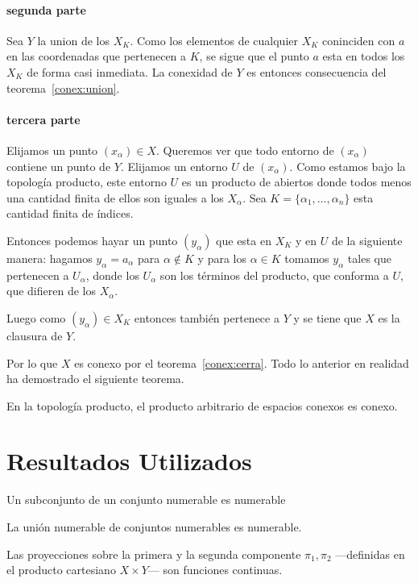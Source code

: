 \documentclass[fleqn,leqno,11pt,letterpaper,final]{article}
\begin{document}
\paragraph{segunda parte}
Sea $Y$ la union de los $X_K$. Como los elementos de cualquier $X_K$ coninciden con
$a$ en las coordenadas que pertenecen a $K$, se sigue que el punto $a$ esta en
todos los $X_K$ de forma casi inmediata. La conexidad de $Y$ es entonces consecuencia del
teorema~\ref{conex:union}.

\paragraph{tercera parte}
Elijamos un punto $(x_\alpha)\in X$. Queremos ver que todo entorno de $(x_\alpha)$ contiene
un punto de $Y$. Elijamos un entorno $U$ de $(x_\alpha)$. Como estamos bajo
la topología producto, este entorno $U$ es un producto de abiertos donde todos
menos una cantidad finita de ellos son iguales a los $X_\alpha$. Sea
$K=\{\alpha_1,\dots,\alpha_n\}$ esta cantidad finita de índices.

Entonces podemos hayar un punto $(y_\alpha)$ que esta en $X_K$ y  en $U$ de la siguiente manera:
hagamos $y_\alpha=a_\alpha$ para $\alpha\notin K$ y para los $\alpha\in K$ tomamos $y_\alpha$
tales que pertenecen a $U_\alpha$, donde los $U_\alpha$ son los términos
del producto, que conforma a $U$, que difieren de los $X_\alpha$.

Luego como $(y_\alpha)\in X_K$ entonces también pertenece a $Y$ y se tiene
que $X$ es la clausura de $Y$.

Por lo que $X$ es conexo por el teorema~\ref{conex:cerra}. Todo lo anterior en realidad ha demostrado
el siguiente teorema.
\begin{teo}
	En la topología producto, el producto arbitrario de espacios conexos es conexo.	
\end{teo}

\section{Resultados Utilizados}
\begin{cor}\label{num:inter}
	Un subconjunto de un conjunto numerable es numerable
\end{cor}
\begin{teo}\label{num:union}
	La unión numerable de conjuntos numerables es numerable.
\end{teo}
\begin{teo}\label{cont:proy}
	Las proyecciones sobre la primera y la segunda componente $\pi_1,\pi_2$ ---definidas en el producto cartesiano $X\times Y$--- son funciones continuas.	
\end{teo}
\end{document}
